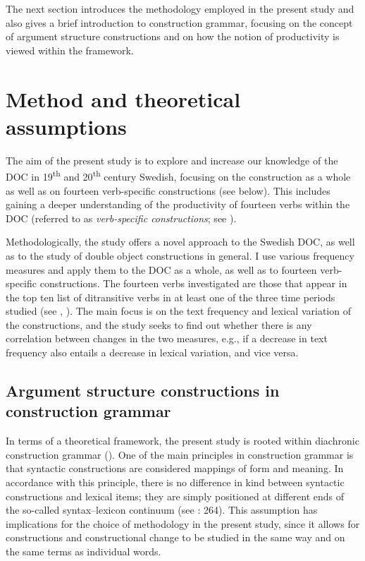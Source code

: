 \documentclass[output=paper]{langscibook}
\begin{document}
The next section introduces the methodology employed in the present study and also gives a brief introduction to construction grammar, focusing on the concept of argument structure constructions and on how the notion of productivity is viewed within the framework. 


\section{Method and theoretical assumptions}\label{sec:valdeson:3}


The aim of the present study is to explore and increase our knowledge of the DOC in 19\textsuperscript{th} and 20\textsuperscript{th} century Swedish, focusing on the construction as a whole as well as on fourteen verb-specific constructions (see below). This includes gaining a deeper understanding of the productivity of fourteen verbs within the DOC (referred to as \textit{verb-specific constructions}; see ).



Methodologically, the study offers a novel approach to the Swedish DOC, as well as to the study of double object constructions in general. I use various frequency measures and apply them to the DOC as a whole, as well as to fourteen verb-specific constructions. The fourteen verbs investigated are those that appear in the top ten list of ditransitive verbs in at least one of the three time periods studied (see , ). The main focus is on the text frequency and lexical variation of the constructions, and the study seeks to find out whether there is any correlation between changes in the two measures, e.g., if a decrease in text frequency also entails a decrease in lexical variation, and vice versa.


\subsection{Argument structure constructions in construction grammar}\label{sec:valdeson:3.1}


In terms of a theoretical framework, the present study is rooted within diachronic construction grammar (\citealt{BardalGildea2015}). One of the main principles in construction grammar is that syntactic constructions are considered mappings of form and meaning. In accordance with this principle, there is no difference in kind between syntactic constructions and lexical items; they are simply positioned at different ends of the so-called syntax–lexicon continuum (see \citealt{CroftCruse2004}: 264). This assumption has implications for the choice of methodology in the present study, since it allows for constructions and constructional change to be studied in the same way and on the same terms as individual words.
\end{document}
